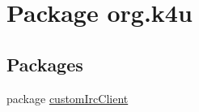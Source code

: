 \hypertarget{namespaceorg_1_1k4u}{\section{Package org.\-k4u}
\label{d3/d9c/namespaceorg_1_1k4u}
}
\subsection*{Packages}
\begin{DoxyCompactItemize}
\item 
package \hyperlink{namespaceorg_1_1k4u_1_1custom_irc_client}{custom\-Irc\-Client}
\end{DoxyCompactItemize}
